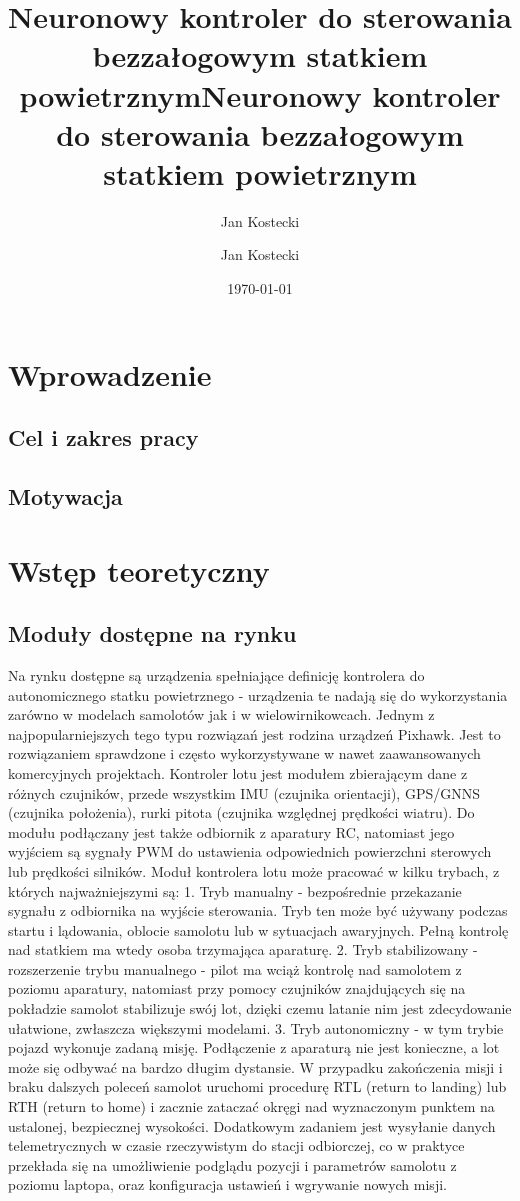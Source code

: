 \documentclass[12pt, a4paper]{article}
\title{Neuronowy kontroler do sterowania bezzałogowym statkiem powietrznym}
\author{Jan Kostecki}
\title{Neuronowy kontroler do sterowania bezzałogowym statkiem powietrznym}
\author{Jan Kostecki}
\date{\today}
\begin{document}
\onehalfspacing
\maketitle
\newpage
\tableofcontents
	
\section{Wprowadzenie}
\subsection{Cel i zakres pracy}
\subsection{Motywacja}

\section{Wstęp teoretyczny}
\subsection{Moduły dostępne na rynku}
Na rynku dostępne są urządzenia spełniające definicję kontrolera do autonomicznego statku powietrznego - urządzenia te nadają się do wykorzystania zarówno w modelach samolotów jak i w wielowirnikowcach. Jednym z najpopularniejszych tego typu rozwiązań jest rodzina urządzeń Pixhawk. Jest to rozwiązaniem sprawdzone i często wykorzystywane w nawet zaawansowanych komercyjnych projektach. Kontroler lotu jest modułem zbierającym dane z różnych czujników, przede wszystkim IMU (czujnika orientacji), GPS/GNNS (czujnika położenia), rurki pitota (czujnika względnej prędkości wiatru). Do modułu podłączany jest także odbiornik z aparatury RC, natomiast jego wyjściem są sygnały PWM do ustawienia odpowiednich powierzchni sterowych lub prędkości silników. 
Moduł kontrolera lotu może pracować w kilku trybach, z których najważniejszymi są:
1.	Tryb manualny - bezpośrednie przekazanie sygnału z odbiornika na wyjście sterowania. Tryb ten może być używany podczas startu i lądowania, oblocie samolotu lub w sytuacjach awaryjnych. Pełną kontrolę nad statkiem ma wtedy osoba trzymająca aparaturę.
2.	Tryb stabilizowany - rozszerzenie trybu manualnego - pilot ma wciąż kontrolę nad samolotem z poziomu aparatury, natomiast przy pomocy czujników znajdujących się na pokładzie samolot stabilizuje swój lot, dzięki czemu latanie nim jest zdecydowanie ułatwione, zwłaszcza większymi modelami.
3.	Tryb autonomiczny - w tym trybie pojazd wykonuje zadaną misję. Podłączenie z aparaturą nie jest konieczne, a lot może się odbywać na bardzo długim dystansie. W przypadku zakończenia misji i braku dalszych poleceń samolot uruchomi procedurę RTL (return to landing) lub RTH (return to home) i zacznie zataczać okręgi nad wyznaczonym punktem na ustalonej, bezpiecznej wysokości.
Dodatkowym zadaniem jest wysyłanie danych telemetrycznych w czasie rzeczywistym do stacji odbiorczej, co w praktyce przekłada się na umożliwienie podglądu pozycji i parametrów samolotu z poziomu laptopa, oraz konfiguracja ustawień i wgrywanie nowych misji.
\end{document}
